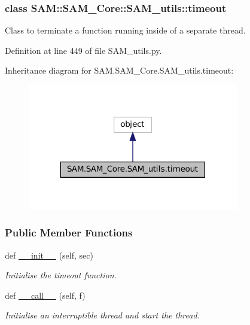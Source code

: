 \label{classSAM_1_1SAM__Core_1_1SAM__utils_1_1timeout}
\subsubsection{class S\+AM\+:\+:S\+A\+M\+\_\+\+Core\+:\+:S\+A\+M\+\_\+utils\+:\+:timeout}
Class to terminate a function running inside of a separate thread. 

Definition at line 449 of file S\+A\+M\+\_\+utils.\+py.



Inheritance diagram for S\+A\+M.\+S\+A\+M\+\_\+\+Core.\+S\+A\+M\+\_\+utils.\+timeout\+:
\nopagebreak
\begin{figure}[H]
\begin{center}
\leavevmode
\includegraphics[width=261pt]{classSAM_1_1SAM__Core_1_1SAM__utils_1_1timeout__inherit__graph}
\end{center}
\end{figure}
\subsubsection*{Public Member Functions}
\begin{DoxyCompactItemize}
\item 
def \hyperlink{group__icubclient__SAM__utils_a40209e793998e2d2feea1eb35b8daacc}{\+\_\+\+\_\+init\+\_\+\+\_\+} (self, sec)
\begin{DoxyCompactList}\small\item\em Initialise the timeout function. \end{DoxyCompactList}\item 
def \hyperlink{group__icubclient__SAM__utils_a9019cee778e9c9547f9388927c4e9144}{\+\_\+\+\_\+call\+\_\+\+\_\+} (self, f)
\begin{DoxyCompactList}\small\item\em Initialise an interruptible thread and start the thread. \end{DoxyCompactList}\end{DoxyCompactItemize}


